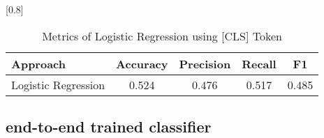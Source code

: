 \documentclass[a4paper,11pt]{article}
\begin{document}
\begin{table}[htbp]
    \centering
    \caption{Metrics of Logistic Regression using [CLS] Token}
    \small
    \scalebox{0.8}[0.8]{
    \begin{tabular}{l|cccc}
         Approach & Accuracy & Precision & Recall & F1 \\ \hline 
         Logistic Regression & 0.524 & 0.476 & 0.517 & 0.485 \\ 



    \end{tabular}

    }
\end{table}
\subsection{end-to-end trained classifier}
\end{document}
